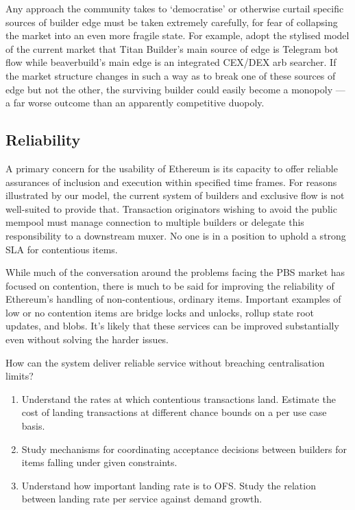 \begin{remark*}[A threat]

    Any approach the community takes to `democratise' or otherwise curtail specific sources of builder edge must be taken extremely carefully, for fear of collapsing the market into an even more fragile state.
    For example, adopt the stylised model of the current market that Titan Builder's main source of edge is Telegram bot flow while beaverbuild's main edge is an integrated CEX/DEX arb searcher.
    If the market structure changes in such a way as to break one of these sources of edge but not the other, the surviving builder could easily become a monopoly --- a far worse outcome than an apparently competitive duopoly.

\end{remark*}

\subsection*{Reliability}

A primary concern for the usability of Ethereum is its capacity to offer reliable assurances of inclusion and execution within specified time frames. 
%
For reasons illustrated by our model, the current system of builders and exclusive flow is not well-suited to provide that. 
%
Transaction originators wishing to avoid the public mempool must manage connection to multiple builders or delegate this responsibility to a downstream muxer.
%
No one is in a position to uphold a strong SLA for contentious items.

While much of the conversation around the problems facing the PBS market has focused on contention, there is much to be said for improving the reliability of Ethereum's handling of non-contentious, ordinary items. 
%
Important examples of low or no contention items are bridge locks and unlocks, rollup state root updates, and blobs. 
%
It's likely that these services can be improved substantially even without solving the harder issues.

How can the system deliver reliable service without breaching centralisation limits?
%
\begin{enumerate}
  \item Understand the rates at which contentious transactions land. Estimate the cost of landing transactions at different chance bounds on a per use case basis.
  \item Study mechanisms for coordinating acceptance decisions between builders for items falling under given constraints.
  \item Understand how important landing rate is to OFS. Study the relation between landing rate per service against demand growth.
\end{enumerate}
%


